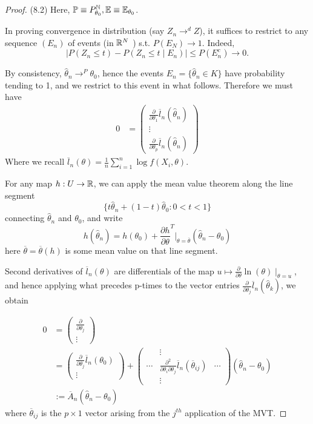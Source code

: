 \documentclass[a4paper]{article}
\begin{document}
\begin{proof}(8.2)
        Here, $\mathbb{P} \equiv P_{\theta_0}^{\mathbb{N}}, \mathbb{E} \equiv \mathbb{E}_{\theta_0}$.

	In proving convergence in distribution (say $Z_n \to ^{d} Z$), it suffices to restrict to any sequence $(E_n)$ of events (in $\mathbb{R}^{N}$ ) s.t. $P\left( E_N \right) \to  1$. Indeed,
	\[
		|P\left( Z_n \le  t \right) - P\left( Z_n \le t  \mid  E_n \right) | \le P\left( E_n^{c} \right) \to 0
	.\]

	By consistency, $\hat{\theta}_n \to ^{P} \theta_0$, hence the events $E_n = \{\hat{\theta}_n \in K\} $ have probability tending to 1, and we restrict to this event in what follows. Therefore we must have
	\begin{align*}
		0 &= \begin{pmatrix} \frac{\partial}{\partial\theta_1} \overline{l}_n (\hat{\theta}_n) \\ \vdots \\ \frac{\partial}{\partial\theta_p} \overline{l}_n (\hat{\theta}_n) \end{pmatrix} 
	\end{align*} 
	Where we recall $\overline{l}_n(\theta) = \frac{1}{n} \sum_{i=1}^{n} \log f(X_i, \theta)$.

	For any map $h: U \to \mathbb{R}$, we can apply the mean value theorem along the line segment \[\{t \hat{\theta}_n + (1-t) \hat{\theta}_0 : 0 < t < 1\} \] connecting $\hat{\theta}_n $ and $\theta_0$, and write
	\[
		h(\hat{\theta}_n) = h(\theta_0) + \frac{\partial h}{\partial \theta}^{T} \bigg\rvert_{\theta = \overline{\theta}} (\hat{\theta}_n - \theta_0) 
	\]
	here $\overline{\theta} = \overline{\theta}(h)$ is some mean value on that line segment.

	Second derivatives of $\overline{l}_n(\theta)$ are differentials of the map $u \mapsto \frac{\partial}{\partial\theta} \ln(\theta)  \mid _{\theta = u}$, and hence applying what precedes p-times to the vector entries $\frac{\partial}{\partial\theta_j} \overline{l}_n(\hat{\theta}_k)$, we obtain

	\begin{align*}
		0 &= \begin{pmatrix} \frac{\partial}{\partial\theta_j} \\ \vdots \end{pmatrix} \\
		&= \begin{pmatrix} \frac{\partial}{\partial\theta_j} \overline{l}_n(\theta_0) \\ \vdots \end{pmatrix} + \begin{pmatrix} & \vdots & \\ \cdots & \frac{\partial^2}{\partial\theta_i \partial\theta_j} \overline{l}_n(\overline{\theta}_{ij}) & \cdots \\ & \vdots &\end{pmatrix} (\hat{\theta}_n - \theta_0) \\
		&:= \overline{A}_n (\hat{\theta}_n - \theta_0)
	\end{align*}
	where $\overline{\theta}_{ij}$ is the $p\times 1$ vector arising from the $j^{th}$ application of the MVT.


\end{proof}
\end{document}
